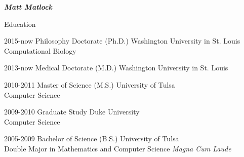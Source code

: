 \documentclass[10pt]{article}
\begin{document}
\begin{cv}{\huge \it \bfseries Matt Matlock}
\begin{cvlist}{Education}
\item[2015-now] Philosophy Doctorate (Ph.D.) \hfill Washington University in St. Louis \\ Computational Biology
\item[2013-now] Medical Doctorate (M.D.)  \hfill Washington University in St. Louis
\item[2010-2011] Master of Science (M.S.) \hfill University of Tulsa \\ Computer Science
\item[2009-2010] Graduate Study \hfill Duke University \\ Computer Science
\item[2005-2009] Bachelor of Science (B.S.) \hfill University of Tulsa \\ Double Major in Mathematics and Computer Science \emph{Magna Cum Laude}
\end{cvlist}



\end{cv}
\end{document}
